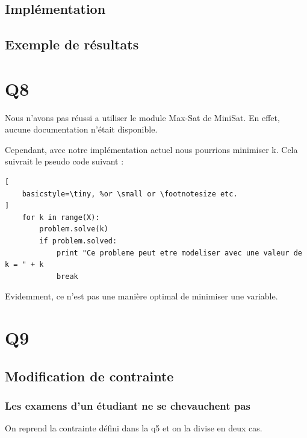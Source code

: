\documentclass[a4paper,11pt]{article}
\begin{document}
\subsection{Implémentation}
\subsection{Exemple de résultats}

\section{Q8}

Nous n'avons pas réussi a utiliser le module Max-Sat de MiniSat.
En effet, aucune documentation n'était disponible.

Cependant, avec notre implémentation actuel nous pourrions minimiser k. Cela suivrait le pseudo code suivant :

\begin{lstlisting}[
    basicstyle=\tiny, %or \small or \footnotesize etc.
]
	for k in range(X):
		problem.solve(k)
		if problem.solved:
			print "Ce probleme peut etre modeliser avec une valeur de k = " + k
			break
\end{lstlisting}
Evidemment, ce n'est pas une manière optimal de minimiser une variable.

\section{Q9}

\subsection{Modification de contrainte}
\subsubsection{Les examens d'un étudiant ne se chevauchent pas}
On reprend la contrainte défini dans la q5 et on la divise en deux cas. 
\end{document}
